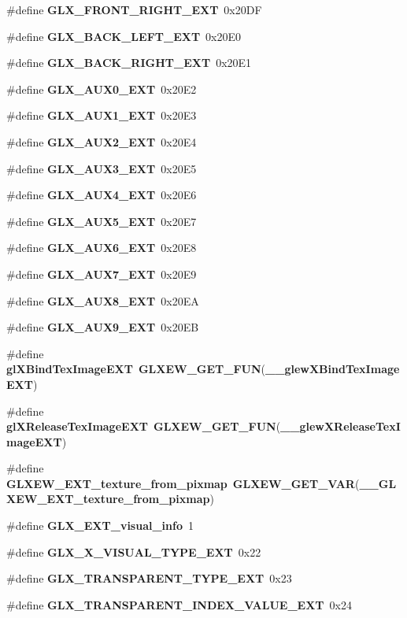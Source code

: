 \begin{DoxyCompactItemize}
\item 
\#define {\bf G\+L\+X\+\_\+\+F\+R\+O\+N\+T\+\_\+\+R\+I\+G\+H\+T\+\_\+\+E\+XT}~0x20\+DF
\item 
\#define {\bf G\+L\+X\+\_\+\+B\+A\+C\+K\+\_\+\+L\+E\+F\+T\+\_\+\+E\+XT}~0x20\+E0
\item 
\#define {\bf G\+L\+X\+\_\+\+B\+A\+C\+K\+\_\+\+R\+I\+G\+H\+T\+\_\+\+E\+XT}~0x20\+E1
\item 
\#define {\bf G\+L\+X\+\_\+\+A\+U\+X0\+\_\+\+E\+XT}~0x20\+E2
\item 
\#define {\bf G\+L\+X\+\_\+\+A\+U\+X1\+\_\+\+E\+XT}~0x20\+E3
\item 
\#define {\bf G\+L\+X\+\_\+\+A\+U\+X2\+\_\+\+E\+XT}~0x20\+E4
\item 
\#define {\bf G\+L\+X\+\_\+\+A\+U\+X3\+\_\+\+E\+XT}~0x20\+E5
\item 
\#define {\bf G\+L\+X\+\_\+\+A\+U\+X4\+\_\+\+E\+XT}~0x20\+E6
\item 
\#define {\bf G\+L\+X\+\_\+\+A\+U\+X5\+\_\+\+E\+XT}~0x20\+E7
\item 
\#define {\bf G\+L\+X\+\_\+\+A\+U\+X6\+\_\+\+E\+XT}~0x20\+E8
\item 
\#define {\bf G\+L\+X\+\_\+\+A\+U\+X7\+\_\+\+E\+XT}~0x20\+E9
\item 
\#define {\bf G\+L\+X\+\_\+\+A\+U\+X8\+\_\+\+E\+XT}~0x20\+EA
\item 
\#define {\bf G\+L\+X\+\_\+\+A\+U\+X9\+\_\+\+E\+XT}~0x20\+EB
\item 
\#define {\bf gl\+X\+Bind\+Tex\+Image\+E\+XT}~{\bf G\+L\+X\+E\+W\+\_\+\+G\+E\+T\+\_\+\+F\+UN}({\bf \+\_\+\+\_\+glew\+X\+Bind\+Tex\+Image\+E\+XT})
\item 
\#define {\bf gl\+X\+Release\+Tex\+Image\+E\+XT}~{\bf G\+L\+X\+E\+W\+\_\+\+G\+E\+T\+\_\+\+F\+UN}({\bf \+\_\+\+\_\+glew\+X\+Release\+Tex\+Image\+E\+XT})
\item 
\#define {\bf G\+L\+X\+E\+W\+\_\+\+E\+X\+T\+\_\+texture\+\_\+from\+\_\+pixmap}~{\bf G\+L\+X\+E\+W\+\_\+\+G\+E\+T\+\_\+\+V\+AR}({\bf \+\_\+\+\_\+\+G\+L\+X\+E\+W\+\_\+\+E\+X\+T\+\_\+texture\+\_\+from\+\_\+pixmap})
\item 
\#define {\bf G\+L\+X\+\_\+\+E\+X\+T\+\_\+visual\+\_\+info}~1
\item 
\#define {\bf G\+L\+X\+\_\+\+X\+\_\+\+V\+I\+S\+U\+A\+L\+\_\+\+T\+Y\+P\+E\+\_\+\+E\+XT}~0x22
\item 
\#define {\bf G\+L\+X\+\_\+\+T\+R\+A\+N\+S\+P\+A\+R\+E\+N\+T\+\_\+\+T\+Y\+P\+E\+\_\+\+E\+XT}~0x23
\item 
\#define {\bf G\+L\+X\+\_\+\+T\+R\+A\+N\+S\+P\+A\+R\+E\+N\+T\+\_\+\+I\+N\+D\+E\+X\+\_\+\+V\+A\+L\+U\+E\+\_\+\+E\+XT}~0x24

\end{DoxyCompactItemize}
